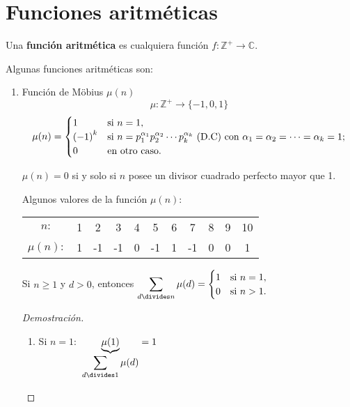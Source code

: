 \chapter{Funciones aritméticas}

\begin{definition}
Una \textbf{función aritmética} es cualquiera función $f\colon\mathbb{Z}^{+}\rightarrow\mathbb{C}$.	
\end{definition}

Algunas funciones aritméticas son:

\begin{enumerate}
	\item Función de M\"{o}bius $\mu(n)$
	\[\mu\colon\mathbb{Z}^{+}\longrightarrow\{-1,0,1\}\]
	\[\mu(n)= 
	\begin{cases}
	1 & \text{si } n=1,\\
	{(-1)}^{k}  & \text{si } n={p}^{\alpha_1}_{1}{p}^{\alpha_2}_{2}\cdots{p}^{\alpha_k}_{k}\text{ (D.C)}\text{ con } \alpha_1=\alpha_2=\cdots=\alpha_k=1;\\
	0&\text{en otro caso.}
	\end{cases}\]
\begin{remark} $\mu(n)=0$ si y solo si $n$ posee un divisor cuadrado perfecto mayor que 1.
\end{remark}
\begin{example}
	Algunos valores de la función $\mu(n)\colon$
	
\begin{table}[H]
	\centering
	\begin{tabular}{ccccccccccc}
		$n\colon$ &1 &2 &3 & 4 & 5 & 6 & 7 & 8 &9 & 10\\[0.1cm]
		$\mu(n)\colon$ &1 &-1 & -1 & 0 & -1 & 1 & -1 & 0 & 0 & 1
	\end{tabular}
\end{table}

\end{example}

\begin{theorem}
	Si $n\geq1$ y $d>0$, entonces $\displaystyle\sum_{d\divides n}\mu(d)= 
	\begin{cases}
	1 & \text{si } n=1,\\
	0 &\text{si } n>1.
	\end{cases}$

\begin{proof}[Demostración]

	\begin{enumerate}
		\item Si $n=1\colon$ $\underbrace{\mu(1)}_{\displaystyle\sum_{d\divides 1}\mu(d)}=1$ \checkmark
		

\end{enumerate}
\end{proof}
\end{theorem}
\end{enumerate}
